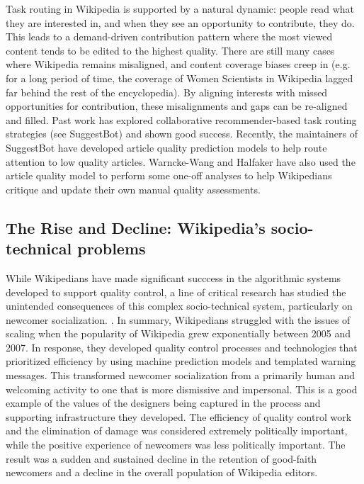  Task routing in Wikipedia is supported by a natural dynamic: people read what they are interested in, and when they see an opportunity to contribute, they do.  This leads to a demand-driven contribution pattern where the most viewed content tends to be edited to the highest quality\cite{hill2014consider}.  There are still many cases where Wikipedia remains misaligned\cite{wang2015misalignment}, and content coverage biases creep in (e.g. for a long period of time, the coverage of Women Scientists in Wikipedia lagged far behind the rest of the encyclopedia\cite{halfaker2017interpolating}).  By aligning interests with missed opportunities for contribution, these misalignments and gaps can be re-aligned and filled.  Past work has explored collaborative recommender-based task routing strategies (see SuggestBot\cite{cosley2007suggestbot}) and shown good success.  Recently, the maintainers of SuggestBot have developed article quality prediction models to help route attention to low quality articles\cite{wang2013tell}.  Warncke-Wang and Halfaker have also used the article quality model to perform some one-off analyses to help Wikipedians critique and update their own manual quality assessments\cite{wang2014screening}.

\subsection{The Rise and Decline: Wikipedia's socio-technical problems}
While Wikipedians have made significant succcess in the algorithmic systems developed to support quality control, a line of critical research has studied the unintended consequences of this complex socio-technical system, particularly on newcomer socialization. \cite{halfaker2013rise}\cite{morgan2013tea}\cite{halfaker2014snuggle}.  In summary, Wikipedians struggled with the issues of scaling when the popularity of Wikipedia grew exponentially between 2005 and 2007\cite{halfaker2013rise}.  In response, they developed quality control processes and technologies that prioritized efficiency by using machine prediction models\cite{halfaker2014snuggle} and templated warning messages\cite{halfaker2013rise}.  This transformed newcomer socialization from a primarily human and welcoming activity to one that is more dismissive and impersonal\cite{morgan2013tea}.  This is a good example of the values of the designers being captured in the process and supporting infrastructure they developed\cite{halfaker2014snuggle}.  The efficiency of quality control work and the elimination of damage was considered extremely politically important, while the positive experience of newcomers was less politically important.  The result was a sudden and sustained decline in the retention of good-faith newcomers and a decline in the overall population of Wikipedia editors\cite{halfaker2013rise}.

